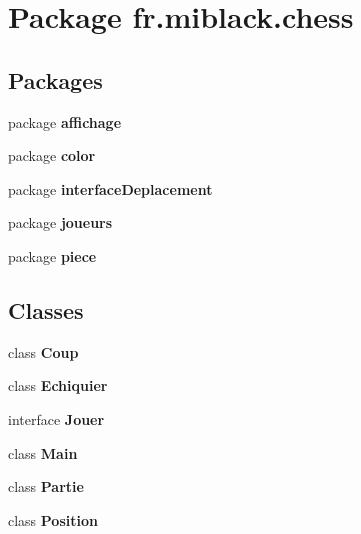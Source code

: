 \section{Package fr.\-miblack.\-chess}
\label{namespacefr_1_1miblack_1_1chess}
\subsection*{Packages}
\begin{DoxyCompactItemize}
\item 
package {\bf affichage}
\item 
package {\bf color}
\item 
package {\bf interface\-Deplacement}
\item 
package {\bf joueurs}
\item 
package {\bf piece}
\end{DoxyCompactItemize}
\subsection*{Classes}
\begin{DoxyCompactItemize}
\item 
class {\bf Coup}
\item 
class {\bf Echiquier}
\item 
interface {\bf Jouer}
\item 
class {\bf Main}
\item 
class {\bf Partie}
\item 
class {\bf Position}
\end{DoxyCompactItemize}
